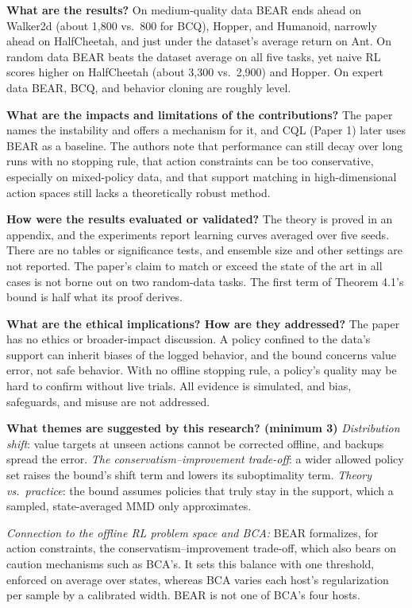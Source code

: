 \documentclass[11pt]{article}
\newcommand{\q}[2]{\item \textbf{#1} #2}
\newcommand{\tiein}[1]{\par\smallskip\noindent\emph{Connection to the offline RL problem space and BCA:} #1\par\medskip}
\begin{document}
\begin{qna}
\q{What are the results?}
On medium-quality data BEAR ends ahead on Walker2d (about 1,800 vs.\ 800 for BCQ), Hopper, and Humanoid, narrowly ahead on HalfCheetah, and just under the dataset's average return on Ant. On random data BEAR beats the dataset average on all five tasks, yet naive RL scores higher on HalfCheetah (about 3,300 vs.\ 2,900) and Hopper. On expert data BEAR, BCQ, and behavior cloning are roughly level.

\q{What are the impacts and limitations of the contributions?}
The paper names the instability and offers a mechanism for it, and CQL (Paper 1) later uses BEAR as a baseline. The authors note that performance can still decay over long runs with no stopping rule, that action constraints can be too conservative, especially on mixed-policy data, and that support matching in high-dimensional action spaces still lacks a theoretically robust method.

\q{How were the results evaluated or validated?}
The theory is proved in an appendix, and the experiments report learning curves averaged over five seeds. There are no tables or significance tests, and ensemble size and other settings are not reported. The paper's claim to match or exceed the state of the art in all cases is not borne out on two random-data tasks. The first term of Theorem 4.1's bound is half what its proof derives.

\q{What are the ethical implications? How are they addressed?}
The paper has no ethics or broader-impact discussion. A policy confined to the data's support can inherit biases of the logged behavior, and the bound concerns value error, not safe behavior. With no offline stopping rule, a policy's quality may be hard to confirm without live trials. All evidence is simulated, and bias, safeguards, and misuse are not addressed.

\q{What themes are suggested by this research? (minimum 3)}
\emph{Distribution shift}: value targets at unseen actions cannot be corrected offline, and backups spread the error. \emph{The conservatism--improvement trade-off}: a wider allowed policy set raises the bound's shift term and lowers its suboptimality term. \emph{Theory vs.\ practice}: the bound assumes policies that truly stay in the support, which a sampled, state-averaged MMD only approximates.

\end{qna}
\tiein{BEAR formalizes, for action constraints, the conservatism--improvement trade-off, which also bears on caution mechanisms such as BCA's. It sets this balance with one threshold, enforced on average over states, whereas BCA varies each host's regularization per sample by a calibrated width. BEAR is not one of BCA's four hosts.}
\end{document}
